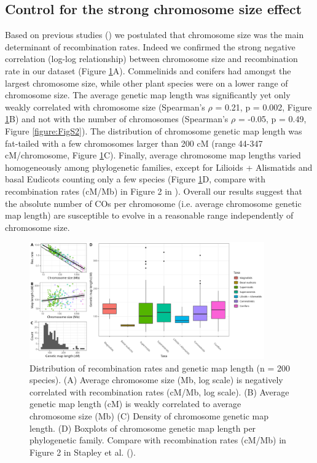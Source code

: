 \documentclass{article}
\begin{document}
\subsection*{Control for the strong chromosome size effect}


Based on previous studies (\cite{brazierDiversityDeterminantsRecombination2022b,haenelMetaanalysisChromosomescaleCrossover2018}) we postulated that chromosome size was the main determinant of recombination rates. Indeed we confirmed the strong negative correlation (log-log relationship) between chromosome size and recombination rate in our dataset (Figure \ref{figure:Fig1}A). Commelinids and conifers had amongst the largest chromosome size, while other plant species were on a lower range of chromosome size. The average genetic map length was significantly yet only weakly correlated with chromosome size (Spearman’s $\rho$ = 0.21, p = 0.002, Figure \ref{figure:Fig1}B) and not with the number of chromosomes (Spearman’s $\rho$ = -0.05, p = 0.49, Figure \ref{figure:FigS2}). The distribution of chromosome genetic map length was fat-tailed with a few chromosomes larger than 200 cM (range 44-347 cM/chromosome, Figure \ref{figure:Fig1}C). Finally, average chromosome map lengths varied homogeneously among phylogenetic families, except for Lilioids + Alismatids and basal Eudicots counting only a few species (Figure \ref{figure:Fig1}D, compare with recombination rates (cM/Mb) in Figure 2 in \cite{stapleyVariationRecombinationFrequency2017}). Overall our results suggest that the absolute number of COs per chromosome (i.e. average chromosome genetic map length) are susceptible to evolve in a reasonable range independently of chromosome size.


\begin{figure}[h!]
  \includegraphics[width=0.9\textwidth]{figures/Fig1.jpeg}
  \centering
  \caption{Distribution of recombination rates and genetic map length  (n = 200 species). (A) Average chromosome size (Mb, log scale) is negatively correlated with recombination rates (cM/Mb, log scale). (B) Average genetic map length (cM) is weakly correlated to average chromosome size (Mb) (C) Density of chromosome genetic map length. (D) Boxplots of chromosome genetic map length per phylogenetic family. Compare with recombination rates (cM/Mb) in Figure 2 in Stapley et al. (\citeyear{stapleyVariationRecombinationFrequency2017}).
  }
  \label{figure:Fig1}
\end{figure}
\end{document}
